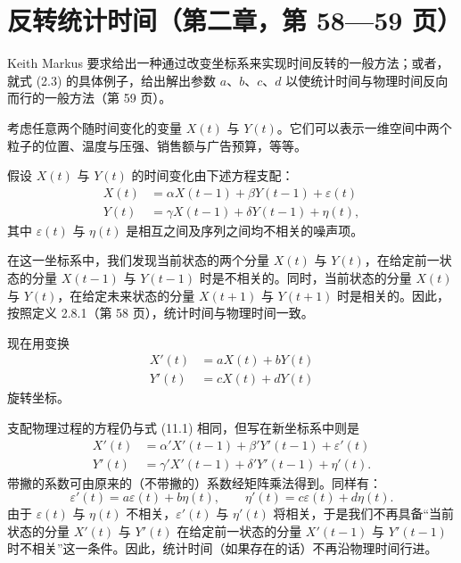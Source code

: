 \section{反转统计时间（第二章，第 58—59 页）}


Keith Markus 要求给出一种通过改变坐标系来实现时间反转的一般方法；或者，就式 (2.3) 的具体例子，给出解出参数 $a$、$b$、$c$、$d$ 以使统计时间与物理时间反向而行的一般方法（第 59 页）。


考虑任意两个随时间变化的变量 $X(t)$ 与 $Y(t)$。它们可以表示一维空间中两个粒子的位置、温度与压强、销售额与广告预算，等等。

假设 $X(t)$ 与 $Y(t)$ 的时间变化由下述方程支配：
\begin{equation}
\begin{aligned}
X(t) &= \alpha X(t-1)+\beta Y(t-1)+\varepsilon(t)\\
Y(t) &= \gamma X(t-1)+\delta Y(t-1)+\eta(t),
\end{aligned}\tag{11.1}
\end{equation}
其中 $\varepsilon(t)$ 与 $\eta(t)$ 是相互之间及序列之间均不相关的噪声项。

在这一坐标系中，我们发现当前状态的两个分量 $X(t)$ 与 $Y(t)$，在给定前一状态的分量 $X(t-1)$ 与 $Y(t-1)$ 时是不相关的。同时，当前状态的分量 $X(t)$ 与 $Y(t)$，在给定未来状态的分量 $X(t+1)$ 与 $Y(t+1)$ 时是相关的。因此，按照定义 2.8.1（第 58 页），统计时间与物理时间一致。

现在用变换
\begin{equation}
\begin{aligned}
X'(t) &= aX(t)+bY(t)\\
Y'(t) &= cX(t)+dY(t)
\end{aligned}\tag{11.2}
\end{equation}
旋转坐标。

支配物理过程的方程仍与式 (11.1) 相同，但写在新坐标系中则是
\begin{equation}
\begin{aligned}
X'(t) &= \alpha'X'(t-1)+\beta'Y'(t-1)+\varepsilon'(t)\\
Y'(t) &= \gamma'X'(t-1)+\delta'Y'(t-1)+\eta'(t).
\end{aligned}\tag{11.3}
\end{equation}
带撇的系数可由原来的（不带撇的）系数经矩阵乘法得到。同样有：
\[
\varepsilon'(t)=a\varepsilon(t)+b\eta(t),\qquad \eta'(t)=c\varepsilon(t)+d\eta(t).
\]
由于 $\varepsilon(t)$ 与 $\eta(t)$ 不相关，$\varepsilon'(t)$ 与 $\eta'(t)$ 将相关，于是我们不再具备“当前状态的分量 $X'(t)$ 与 $Y'(t)$ 在给定前一状态的分量 $X'(t-1)$ 与 $Y'(t-1)$ 时不相关”这一条件。因此，统计时间（如果存在的话）不再沿物理时间行进。

